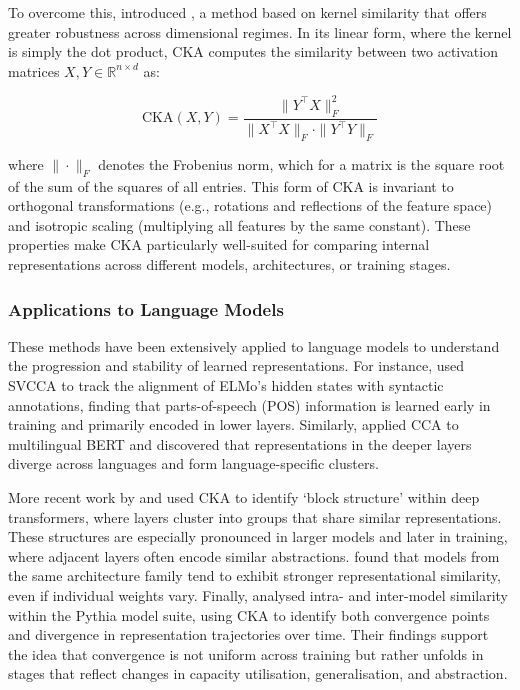 To overcome this, \citet{kornblith2019cka} introduced , a method based on kernel similarity that offers greater robustness across dimensional regimes. In its linear form, where the kernel is simply the dot product, CKA computes the similarity between two activation matrices \( X, Y \in \mathbb{R}^{n \times d} \) as:

\[
\mathrm{CKA}(X, Y) = \frac{\| Y^\top X \|_F^2}{\| X^\top X \|_F \cdot \| Y^\top Y \|_F}
\]

where \( \|\cdot\|_F \) denotes the Frobenius norm, which for a matrix is the square root of the sum of the squares of all entries. This form of CKA is invariant to orthogonal transformations (e.g., rotations and reflections of the feature space) and isotropic scaling (multiplying all features by the same constant). These properties make CKA particularly well-suited for comparing internal representations across different models, architectures, or training stages.
 
\subsubsection{Applications to Language Models}

These methods have been extensively applied to language models to understand the progression and stability of learned representations. For instance, \citet{saphra2019understanding} used SVCCA to track the alignment of ELMo's hidden states with syntactic annotations, finding that parts-of-speech (POS) information is learned early in training and primarily encoded in lower layers. Similarly, \citet{singh2019bert} applied CCA to multilingual BERT and discovered that representations in the deeper layers diverge across languages and form language-specific clusters.

More recent work by \citet{nguyen2020wide} and \citet{phang2021finetuned} used CKA to identify `block structure' within deep transformers, where layers cluster into groups that share similar representations. These structures are especially pronounced in larger models and later in training, where adjacent layers often encode similar abstractions. \citet{wu2020similarity} found that models from the same architecture family tend to exhibit stronger representational similarity, even if individual weights vary. Finally, \citet{brown2023understanding} analysed intra- and inter-model similarity within the Pythia model suite, using CKA to identify both convergence points and divergence in representation trajectories over time. Their findings support the idea that convergence is not uniform across training but rather unfolds in stages that reflect changes in capacity utilisation, generalisation, and abstraction.

